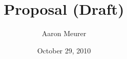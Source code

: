 \documentclass[12pt]{article}
\begin{document}
\title{Proposal (Draft)}
\author{Aaron Meurer}
\date{October 29, 2010}
\maketitle
\end{document}
